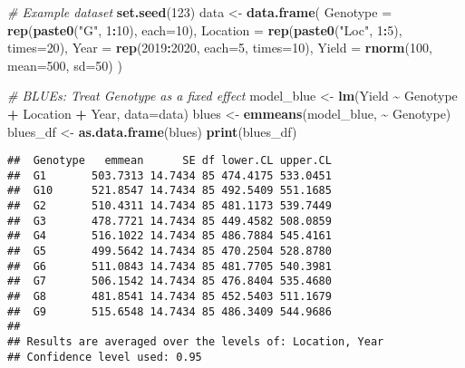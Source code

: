 \documentclass[
]{article}
\newenvironment{Shaded}{\begin{snugshade}}{\end{snugshade}}
\newcommand{\AttributeTok}[1]{\textcolor[rgb]{0.13,0.29,0.53}{#1}}
\newcommand{\CommentTok}[1]{\textcolor[rgb]{0.56,0.35,0.01}{\textit{#1}}}
\newcommand{\DecValTok}[1]{\textcolor[rgb]{0.00,0.00,0.81}{#1}}
\newcommand{\FunctionTok}[1]{\textcolor[rgb]{0.13,0.29,0.53}{\textbf{#1}}}
\newcommand{\NormalTok}[1]{#1}
\newcommand{\OtherTok}[1]{\textcolor[rgb]{0.56,0.35,0.01}{#1}}
\newcommand{\SpecialCharTok}[1]{\textcolor[rgb]{0.81,0.36,0.00}{\textbf{#1}}}
\newcommand{\StringTok}[1]{\textcolor[rgb]{0.31,0.60,0.02}{#1}}
\begin{document}
\begin{Shaded}
\begin{Highlighting}[]
\CommentTok{\# Example dataset}
\FunctionTok{set.seed}\NormalTok{(}\DecValTok{123}\NormalTok{)}
\NormalTok{data }\OtherTok{\textless{}{-}} \FunctionTok{data.frame}\NormalTok{(}
  \AttributeTok{Genotype =} \FunctionTok{rep}\NormalTok{(}\FunctionTok{paste0}\NormalTok{(}\StringTok{"G"}\NormalTok{, }\DecValTok{1}\SpecialCharTok{:}\DecValTok{10}\NormalTok{), }\AttributeTok{each=}\DecValTok{10}\NormalTok{),}
  \AttributeTok{Location =} \FunctionTok{rep}\NormalTok{(}\FunctionTok{paste0}\NormalTok{(}\StringTok{"Loc"}\NormalTok{, }\DecValTok{1}\SpecialCharTok{:}\DecValTok{5}\NormalTok{), }\AttributeTok{times=}\DecValTok{20}\NormalTok{),}
  \AttributeTok{Year =} \FunctionTok{rep}\NormalTok{(}\DecValTok{2019}\SpecialCharTok{:}\DecValTok{2020}\NormalTok{, }\AttributeTok{each=}\DecValTok{5}\NormalTok{, }\AttributeTok{times=}\DecValTok{10}\NormalTok{),}
  \AttributeTok{Yield =} \FunctionTok{rnorm}\NormalTok{(}\DecValTok{100}\NormalTok{, }\AttributeTok{mean=}\DecValTok{500}\NormalTok{, }\AttributeTok{sd=}\DecValTok{50}\NormalTok{)}
\NormalTok{)}

\CommentTok{\# BLUEs: Treat Genotype as a fixed effect}
\NormalTok{model\_blue }\OtherTok{\textless{}{-}} \FunctionTok{lm}\NormalTok{(Yield }\SpecialCharTok{\textasciitilde{}}\NormalTok{ Genotype }\SpecialCharTok{+}\NormalTok{ Location }\SpecialCharTok{+}\NormalTok{ Year, }\AttributeTok{data=}\NormalTok{data)}
\NormalTok{blues }\OtherTok{\textless{}{-}} \FunctionTok{emmeans}\NormalTok{(model\_blue, }\SpecialCharTok{\textasciitilde{}}\NormalTok{ Genotype)}
\NormalTok{blues\_df }\OtherTok{\textless{}{-}} \FunctionTok{as.data.frame}\NormalTok{(blues)}
\FunctionTok{print}\NormalTok{(blues\_df)}
\end{Highlighting}
\end{Shaded}

\begin{verbatim}
##  Genotype   emmean      SE df lower.CL upper.CL
##  G1       503.7313 14.7434 85 474.4175 533.0451
##  G10      521.8547 14.7434 85 492.5409 551.1685
##  G2       510.4311 14.7434 85 481.1173 539.7449
##  G3       478.7721 14.7434 85 449.4582 508.0859
##  G4       516.1022 14.7434 85 486.7884 545.4161
##  G5       499.5642 14.7434 85 470.2504 528.8780
##  G6       511.0843 14.7434 85 481.7705 540.3981
##  G7       506.1542 14.7434 85 476.8404 535.4680
##  G8       481.8541 14.7434 85 452.5403 511.1679
##  G9       515.6548 14.7434 85 486.3409 544.9686
## 
## Results are averaged over the levels of: Location, Year 
## Confidence level used: 0.95
\end{verbatim}
\end{document}
